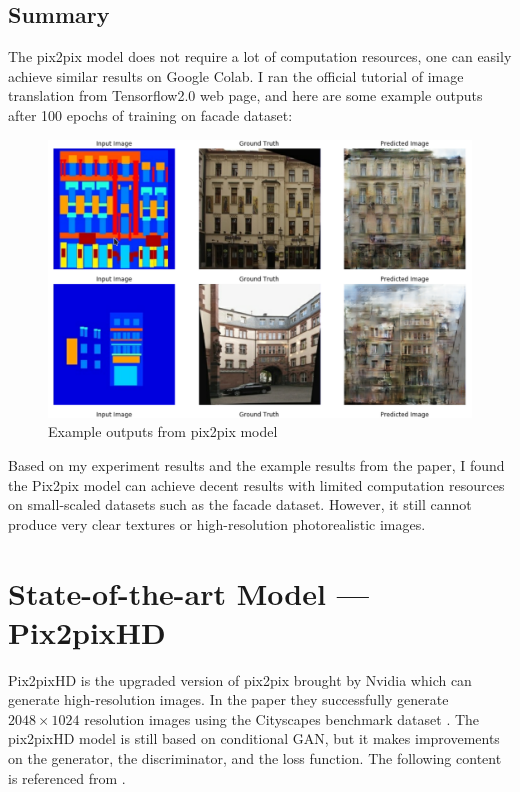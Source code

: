 \subsection{Summary}
The pix2pix model does not require a lot of computation resources, one can easily 
achieve similar results on Google Colab. I ran the official tutorial 
\cite{tf-pix2pix-tutorial} of image translation from Tensorflow2.0 web page, 
and here are some example outputs after 
100 epochs of training on facade dataset\cite{Tylecek13}:
\begin{figure}[H]
    \begin{center}
    \includegraphics[width=12cm]{figures/pix2pix-output}
    \end{center}
    \caption{Example outputs from pix2pix model}
    \label{fig:pix2pix-output}
\end{figure}

Based on my experiment results and the example results from the paper, I found the
Pix2pix model can achieve decent results with limited computation resources on 
small-scaled datasets such as the facade dataset. However, it still cannot produce very
clear textures or high-resolution photorealistic images.

\section{State-of-the-art Model — Pix2pixHD}
Pix2pixHD is the upgraded version of pix2pix brought by 
Nvidia which can generate high-resolution images. In the paper they successfully 
generate $2048\times1024$ resolution images using the Cityscapes benchmark dataset
\cite{Cordts2016Cityscapes}. The pix2pixHD model is still based on conditional GAN, but
it makes improvements on the generator, the discriminator, and the loss function. 
The following content is referenced from \cite{wang2018pix2pixHD}.

